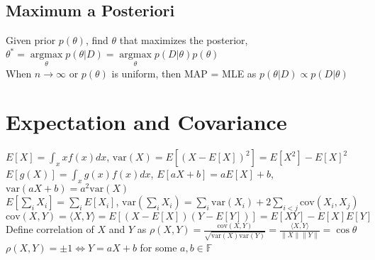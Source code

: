 \documentclass{article}
\newcommand{\V}{\mbox{var}}
\newcommand{\C}{\mbox{cov}}
\newcommand\inner[2]{\langle #1, #2 \rangle}
\DeclareMathOperator*{\argmax}{argmax}
\begin{document}
\subsection{Maximum a Posteriori}
Given prior $p(\theta)$, find $\theta$ that maximizes the posterior, $\theta^* = \argmax\limits_\theta p(\theta|D) = \argmax\limits_\theta p(D| \theta)p(\theta)$ \\
When $n \to \infty$ or $p(\theta)$ is uniform, then MAP = MLE as $p(\theta | D) \propto p(D|\theta)$

\section{Expectation and Covariance}
$E[X] = \int_x x f(x)dx$, $\V(X) = E[(X-E[X])^2] = E[X^2] - E[X]^2$ \\
$E[g(X)] = \int_x g(x) f(x)dx$, $E[aX + b] = aE[X] + b$, $\V(aX + b) = a^2\V(X)$\\
$E[\sum_i X_i] = \sum_i E[X_i]$, $\V(\sum_{i} X_i) = \sum_{i} \V(X_i) + 2\sum\limits_{i < j}\C(X_i, X_j)$ \\
$\C(X, Y) = \inner{X}{Y} = E[(X-E[X])(Y-E[Y])] = E[XY] - E[X]E[Y]$ \\
Define correlation of $X$ and $Y$ as $\rho(X, Y) = \frac{\C(X, Y)}{\sqrt{\V(X)\V(Y)}} = \frac{\langle X, Y \rangle}{\|X\| \|Y\|} = \cos\theta$ \\
$\rho(X,Y) =  \pm 1 \iff Y = aX + b$ for some $a, b \in \mathbb{F}$ 
\end{document}
